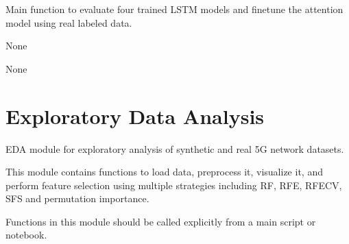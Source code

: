 \documentclass[letterpaper,10pt,english]{sphinxmanual}
\begin{document}

\begin{fulllineitems}
\label{\detokenize{lstm_results_real_data:lstm_results_real_data.run_evaluation_and_finetuning}}
\pysigstartsignatures
{}
\pysigstopsignatures
\sphinxAtStartPar
Main function to evaluate four trained LSTM models and fine\sphinxhyphen{}tune the attention model
using real labeled data.
\begin{description}
\sphinxAtStartPar
None

\sphinxAtStartPar
None

\end{description}

\end{fulllineitems}


\sphinxstepscope


\chapter{Exploratory Data Analysis}
\label{\detokenize{eda:module-eda}}\label{\detokenize{eda:exploratory-data-analysis}}\label{\detokenize{eda::doc}}
\sphinxAtStartPar
EDA module for exploratory analysis of synthetic and real 5G network datasets.

\sphinxAtStartPar
This module contains functions to load data, preprocess it, visualize it,
and perform feature selection using multiple strategies including RF, RFE,
RFECV, SFS and permutation importance.

\sphinxAtStartPar
Functions in this module should be called explicitly from a main script or notebook.
\end{document}
